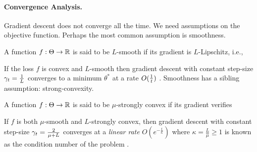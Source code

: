 \paragraph{Convergence Analysis.}
Gradient descent does not converge all the time.
We need assumptions on the objective function.
Perhaps the most common assumption is smoothness.
\begin{definition}[smoothness]
	A function $f:\Theta \rightarrow\mathbb{R}$ is said to be $L$-smooth if its gradient is $L$-Lipschitz, i.e.,
\end{definition}
If the loss  $f$ is convex and $L$-smooth then gradient descent with constant step-size $\gamma_t = \frac{1}{L}$ converges to a minimum $\theta^*$ at a rate $O(\frac{1}{t})$ \citep[corollary 2.1.2]{nesterov2004Intro}.
Smoothness has a sibling assumption: strong-convexity.
\begin{definition}
	A function $f:\Theta \rightarrow\mathbb{R}$ is said to be $\mu$-strongly convex if its gradient verifies
\end{definition}
If $f$ is both $\mu$-smooth and $L$-strongly convex, then gradient descent with constant step-size $\gamma_t = \frac{2}{\mu + L}$ converges at a \emph{linear rate} $O(e^{-\frac{t}{\kappa}})$ where $\kappa= \frac{L}{\mu} \geq 1$ is known as the condition number of the problem \citep[theorem 2.1.15]{nesterov2004Intro}.

